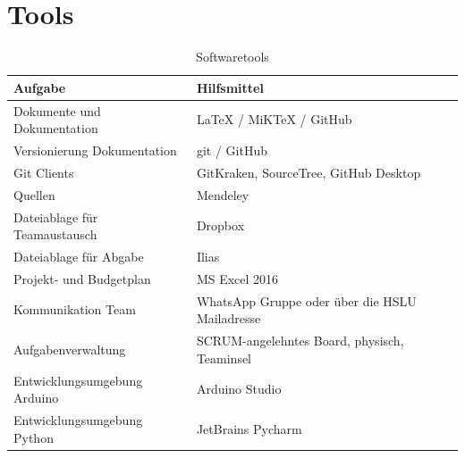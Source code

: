 \documentclass[a4paper]{report}
\begin{document}
\section{Tools}
\label{sec:Tools}
\begin{table}[h!]
	\begin{tabular}{|p{}|p{}|}
		\hline
		\textbf{Aufgabe} & \textbf{Hilfsmittel} \\
		\hline
		Dokumente und Dokumentation & LaTeX / MiKTeX / GitHub \\
		\hline
		Versionierung Dokumentation & git / GitHub\\
		\hline
		Git Clients & GitKraken, SourceTree, GitHub Desktop\\
		\hline
		Quellen & Mendeley \\
		\hline
		Dateiablage für Teamaustausch & Dropbox \\
		\hline
		Dateiablage für Abgabe & Ilias \\
		\hline
		Projekt- und Budgetplan & MS Excel 2016 \\
		\hline
		Kommunikation Team & WhatsApp Gruppe oder über die HSLU Mailadresse\\
		\hline
		Aufgabenverwaltung & SCRUM-angelehntes Board, physisch, Teaminsel\\
		\hline
		Entwicklungsumgebung Arduino & Arduino Studio\\
		\hline
		Entwicklungsumgebung Python & JetBrains Pycharm\\
		\hline
	\end{tabular}
	\caption{Softwaretools}
	\label{tab:SWTools}
\end{table}

\newpage
\end{document}
